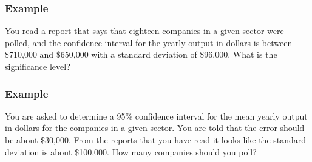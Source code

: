 \begin{frame}
  \frametitle{Example}

  You read a report that says that eighteen companies in a given
  sector were polled, and the confidence interval for the yearly
  output in dollars is between \$710,000 and \$650,000 with a standard
  deviation of \$96,000. What is the significance level?

  \vfill


  \vfill

\end{frame}


\begin{frame}
  \frametitle{Example}

  You are asked to determine a 95\% confidence interval for the mean
  yearly output in dollars for the companies in a given sector. You
  are told that the error should be about \$30,000. From the reports
  that you have read it looks like the standard deviation is about
  \$100,000. How many companies should you poll?

  \vfill


  \vfill


\end{frame}



